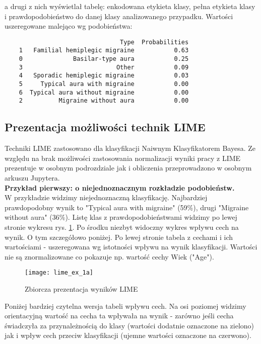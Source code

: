 a drugi z nich wyświetlał tabelę: enkodowana etykieta klasy, pełna etykieta klasy i prawdopodobieństwo do danej klasy analizowanego przypadku. Wartości uszeregowane malejąco wg podobieństwa:

\begin{verbatim}
                                Type  Probabilities
    1   Familial hemiplegic migraine           0.63
    0              Basilar-type aura           0.25
    3                          Other           0.09
    4   Sporadic hemiplegic migraine           0.03
    5     Typical aura with migraine           0.00
    6  Typical aura without migraine           0.00
    2          Migraine without aura           0.00
\end{verbatim}

\subsection{Prezentacja możliwości technik LIME}
Techniki LIME zastosowano dla klasyfikacji Naiwnym Klasyfikatorem Bayesa. Ze względu na brak możliwości zastosowania normalizacji wyniki pracy z LIME prezentuje w osobnym podrozdziale jak i obliczenia przeprowadzono w osobnym arkuszu Jupytera.\\

\textbf{Przykład pierwszy: o niejednoznacznym rozkładzie podobieństw.}\\
\noindent W przykładzie widzimy niejednoznaczną klasyfikację. Najbardziej prawdopodobny wynik to "Typical aura with migraine" (59\%), drugi "Migraine without aura" (36\%). Listę klas z prawdopodobieństwami widzimy po lewej stronie wykresu rys. \ref{fig:lime_ex_1a}. Po środku niezbyt widoczny wykres wpływu cech na wynik. O tym szczegółowo poniżej. Po lewej stronie tabela z cechami i ich wartościami - uszeregowana wg istotności wpływu na wynik klasyfikacji. Wartości nie są znormalizowane co pokazuje np. wartość cechy Wiek ("Age").\\

\begin{figure}[H]
    \centering
    \texttt{[image: lime\_ex\_1a]}
    \caption{Zbiorcza prezentacja wyników LIME}
    \label{fig:lime_ex_1a}
\end{figure}

Poniżej bardziej czytelna wersja tabeli wpływu cech. Na osi poziomej widzimy orientacyjną wartość na cecha ta wpływała na wynik - zarówno jeśli cecha świadczyła za przynależnością do klasy (wartości dodatnie oznaczone na zielono) jak i wpływ cech przeciw klasyfikacji (ujemne wartości oznaczone na czerwono).\\

